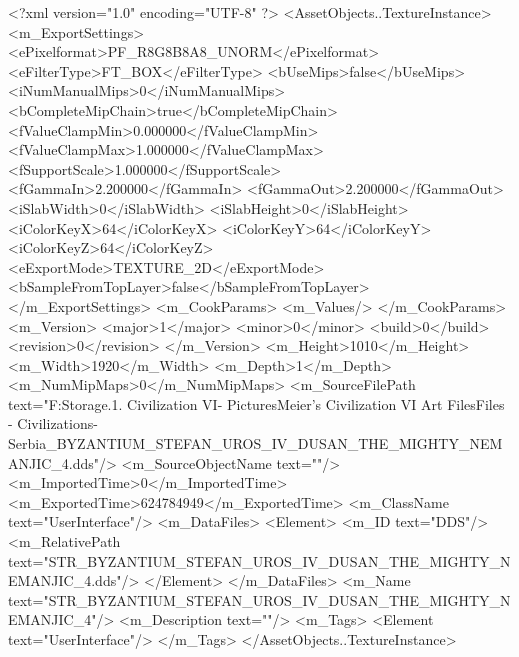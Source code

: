 <?xml version="1.0" encoding="UTF-8" ?>
<AssetObjects..TextureInstance>
	<m_ExportSettings>
		<ePixelformat>PF_R8G8B8A8_UNORM</ePixelformat>
		<eFilterType>FT_BOX</eFilterType>
		<bUseMips>false</bUseMips>
		<iNumManualMips>0</iNumManualMips>
		<bCompleteMipChain>true</bCompleteMipChain>
		<fValueClampMin>0.000000</fValueClampMin>
		<fValueClampMax>1.000000</fValueClampMax>
		<fSupportScale>1.000000</fSupportScale>
		<fGammaIn>2.200000</fGammaIn>
		<fGammaOut>2.200000</fGammaOut>
		<iSlabWidth>0</iSlabWidth>
		<iSlabHeight>0</iSlabHeight>
		<iColorKeyX>64</iColorKeyX>
		<iColorKeyY>64</iColorKeyY>
		<iColorKeyZ>64</iColorKeyZ>
		<eExportMode>TEXTURE_2D</eExportMode>
		<bSampleFromTopLayer>false</bSampleFromTopLayer>
	</m_ExportSettings>
	<m_CookParams>
		<m_Values/>
	</m_CookParams>
	<m_Version>
		<major>1</major>
		<minor>0</minor>
		<build>0</build>
		<revision>0</revision>
	</m_Version>
	<m_Height>1010</m_Height>
	<m_Width>1920</m_Width>
	<m_Depth>1</m_Depth>
	<m_NumMipMaps>0</m_NumMipMaps>
	<m_SourceFilePath text="F:\Mod Storage\2.1. Civilization VI\Mods\Archive - Pictures\Sid Meier's Civilization VI Art Files\Art Files - Civilizations\Civilization - Serbia\STR_BYZANTIUM_STEFAN_UROS_IV_DUSAN_THE_MIGHTY_NEMANJIC_4.dds"/>
	<m_SourceObjectName text=""/>
	<m_ImportedTime>0</m_ImportedTime>
	<m_ExportedTime>624784949</m_ExportedTime>
	<m_ClassName text="UserInterface"/>
	<m_DataFiles>
		<Element>
			<m_ID text="DDS"/>
			<m_RelativePath text="STR_BYZANTIUM_STEFAN_UROS_IV_DUSAN_THE_MIGHTY_NEMANJIC_4.dds"/>
		</Element>
	</m_DataFiles>
	<m_Name text="STR_BYZANTIUM_STEFAN_UROS_IV_DUSAN_THE_MIGHTY_NEMANJIC_4"/>
	<m_Description text=""/>
	<m_Tags>
		<Element text="UserInterface"/>
	</m_Tags>
</AssetObjects..TextureInstance>

